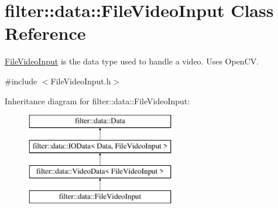 \hypertarget{classfilter_1_1data_1_1_file_video_input}{}\section{filter\+:\+:data\+:\+:File\+Video\+Input Class Reference}
\label{classfilter_1_1data_1_1_file_video_input}


\hyperlink{classfilter_1_1data_1_1_file_video_input}{File\+Video\+Input} is the data type used to handle a video. Uses Open\+CV.  




{\ttfamily \#include $<$File\+Video\+Input.\+h$>$}

Inheritance diagram for filter\+:\+:data\+:\+:File\+Video\+Input\+:\begin{figure}[H]
\begin{center}
\leavevmode
\includegraphics[height=4.000000cm]{dd/da2/classfilter_1_1data_1_1_file_video_input}
\end{center}
\end{figure}
